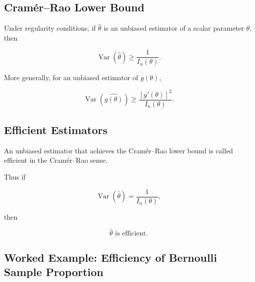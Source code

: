 \subsection{Cram\'er--Rao Lower Bound}
\label{subsec:cramer-rao}

\begin{theorem}
Under regularity conditions, if \(\widehat{\theta}\) is an unbiased
estimator of a scalar parameter \(\theta\), then

\[
\boxed{
\operatorname{Var}(\widehat{\theta})
\geq
\frac1{I_n(\theta)}.
}
\]
\end{theorem}

More generally, for an unbiased estimator of \(g(\theta)\),

\[
\boxed{
\operatorname{Var}
(
\widehat{g(\theta)}
)
\geq
\frac{
[g'(\theta)]^2
}{
I_n(\theta)
}.
}
\]

\subsection{Efficient Estimators}
\label{subsec:efficient-estimators-crlb}

An unbiased estimator that achieves the Cram\'er--Rao lower bound is
called efficient in the Cram\'er--Rao sense.

Thus if

\[
\operatorname{Var}(\widehat{\theta})
=
\frac1{I_n(\theta)},
\]

then

\[
\boxed{
\widehat{\theta}
\text{ is efficient}.
}
\]

\subsection{Worked Example: Efficiency of Bernoulli Sample Proportion}
\label{subsec:worked-bernoulli-efficiency}

